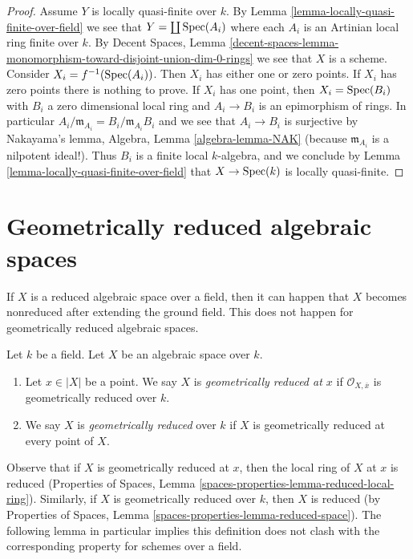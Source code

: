 \begin{proof}
Assume $Y$ is locally quasi-finite over $k$. By
Lemma \ref{lemma-locally-quasi-finite-over-field}
we see that $Y = \coprod \mathop{\mathrm{Spec}}(A_i)$ where each $A_i$ is an
Artinian local ring finite over $k$. By
Decent Spaces, Lemma
\ref{decent-spaces-lemma-monomorphism-toward-disjoint-union-dim-0-rings}
we see that $X$ is a scheme. Consider $X_i = f^{-1}(\mathop{\mathrm{Spec}}(A_i))$.
Then $X_i$ has either one or zero points. If $X_i$ has zero points there
is nothing to prove. If $X_i$ has one point, then
$X_i = \mathop{\mathrm{Spec}}(B_i)$ with $B_i$ a zero dimensional local ring
and $A_i \to B_i$ is an epimorphism of rings. In particular
$A_i/\mathfrak m_{A_i} = B_i/\mathfrak m_{A_i}B_i$ and we see that
$A_i \to B_i$ is surjective by Nakayama's lemma,
Algebra, Lemma \ref{algebra-lemma-NAK}
(because $\mathfrak m_{A_i}$ is a nilpotent ideal!).
Thus $B_i$ is a finite local $k$-algebra, and we conclude by
Lemma \ref{lemma-locally-quasi-finite-over-field}
that $X \to \mathop{\mathrm{Spec}}(k)$ is locally quasi-finite.
\end{proof}











\section{Geometrically reduced algebraic spaces}
\label{section-geometrically-reduced}

\noindent
If $X$ is a reduced algebraic space over a field, then it can happen that $X$
becomes nonreduced after extending the ground field. This does not happen
for geometrically reduced algebraic spaces.

\begin{definition}
\label{definition-geometrically-reduced}
Let $k$ be a field.
Let $X$ be an algebraic space over $k$.
\begin{enumerate}
\item Let $x \in |X|$ be a point. We say $X$ is
{\it geometrically reduced at $x$} if $\mathcal{O}_{X, \overline{x}}$
is geometrically reduced over $k$.
\item We say $X$ is {\it geometrically reduced} over $k$
if $X$ is geometrically reduced at every point of $X$.
\end{enumerate}
\end{definition}

\noindent
Observe that if $X$ is geometrically reduced at $x$, then the local
ring of $X$ at $x$ is reduced (Properties of Spaces, Lemma
\ref{spaces-properties-lemma-reduced-local-ring}).
Similarly, if $X$ is geometrically reduced over $k$, then $X$ is reduced
(by Properties of Spaces, Lemma \ref{spaces-properties-lemma-reduced-space}).
The following lemma in particular implies this definition does not clash
with the corresponding property for schemes over a field.

